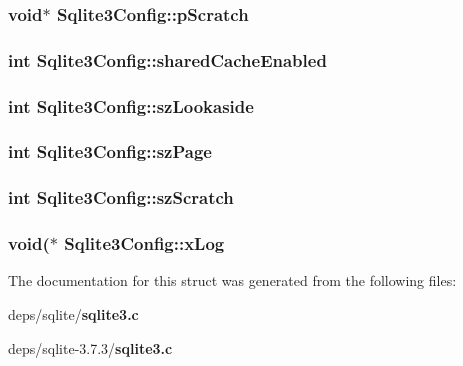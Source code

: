 \subsubsection{\setlength{\rightskip}{0pt plus 5cm}void$\ast$ \bf{Sqlite3Config::p\-Scratch}}\label{structSqlite3Config_399aec4e9b78252a0f242417c9cabbf6}


\subsubsection{\setlength{\rightskip}{0pt plus 5cm}int \bf{Sqlite3Config::shared\-Cache\-Enabled}}\label{structSqlite3Config_11aed45f808a1809b4eb1cf9dada94c8}


\subsubsection{\setlength{\rightskip}{0pt plus 5cm}int \bf{Sqlite3Config::sz\-Lookaside}}\label{structSqlite3Config_a078cc98fca05b3cdf115c95c3a7d43d}


\subsubsection{\setlength{\rightskip}{0pt plus 5cm}int \bf{Sqlite3Config::sz\-Page}}\label{structSqlite3Config_f15d0f981c55a82eba366743e70ce3bd}


\subsubsection{\setlength{\rightskip}{0pt plus 5cm}int \bf{Sqlite3Config::sz\-Scratch}}\label{structSqlite3Config_9581746d7572929e576fac93e72d1f2e}


\subsubsection{\setlength{\rightskip}{0pt plus 5cm}void($\ast$ \bf{Sqlite3Config::x\-Log}}\label{structSqlite3Config_6ee0b136528b3e2fe6914b3c189a9946}




The documentation for this struct was generated from the following files:\begin{CompactItemize}
\item 
deps/sqlite/\bf{sqlite3.c}\item 
deps/sqlite-3.7.3/\bf{sqlite3.c}\end{CompactItemize}
